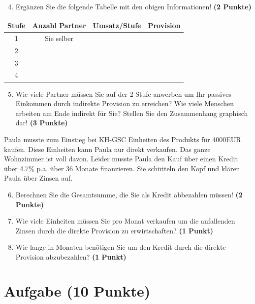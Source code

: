 \documentclass[a4paper, 9pt]{scrartcl}\usepackage[]{graphicx}\usepackage[]{xcolor}
\begin{document}
\begin{enumerate}
  \setcounter{enumi}{3}
\item Ergänzen Sie die folgende Tabelle mit den obigen Informationen! \textbf{(2 Punkte)}
\end{enumerate}

\begin{center}
\begin{tabular}{c|c|c|c}
  \toprule
  \textbf{Stufe} & \textbf{Anzahl Partner}  & \textbf{Umsatz/Stufe} & \textbf{Provision}\\
  \midrule
  1 & Sie selber  &  & \\ \midrule
  2 &   &  &  \\ \midrule
  3 &   &  &  \\ \midrule
  4 &   &  &  \\
  \bottomrule
\end{tabular}
\end{center}

\begin{enumerate}
  \setcounter{enumi}{4}
\item Wie viele Partner müssen Sie auf der 2 Stufe anwerben um Ihr passives Einkommen durch indirekte Provision zu erreichen? Wie viele Menschen arbeiten am Ende indirekt für Sie? Stellen Sie den Zusammenhang graphisch dar!  \textbf{(3 Punkte)}
\end{enumerate}

Paula musste zum Einstieg bei KH-GSC Einheiten des Produkts für 4000EUR kaufen. Diese Einheiten kann Paula nur direkt verkaufen. Das ganze Wohnzimmer ist voll davon. Leider musste Paula den Kauf über einen Kredit über 4.7\% p.a. über 36 Monate finanzieren. Sie schütteln den Kopf und klären Paula über Zinsen auf.

\begin{enumerate}
  \setcounter{enumi}{5}
\item Berechnen Sie die Gesamtsumme, die Sie als Kredit abbezahlen müssen! \textbf{(2 Punkte)}
\item Wie viele Einheiten müssen Sie pro Monat verkaufen um die anfallenden Zinsen durch die direkte Provision zu erwirtschaften? \textbf{(1 Punkt)}
\item Wie lange in Monaten benötigen Sie um den Kredit durch die direkte Provision abzubezahlen? \textbf{(1 Punkt)}
\end{enumerate} 
\clearpage

\section{Aufgabe \hfill (10 Punkte)}
\end{document}
